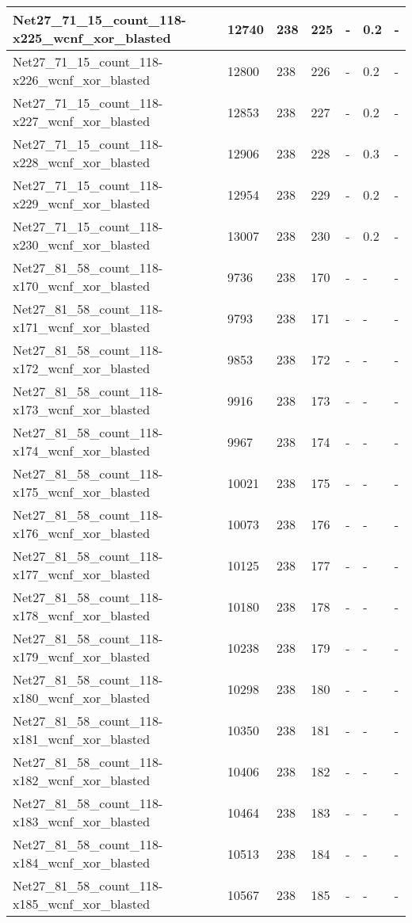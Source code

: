 \begin{scriptsize}
\begin{longtable}{|p{5cm}|l|l|l|l|l|l|}
Net27\_71\_15\_count\_118-x225\_wcnf\_xor\_blasted&12740&238&225&-&0.2&- \\ \hline 
Net27\_71\_15\_count\_118-x226\_wcnf\_xor\_blasted&12800&238&226&-&0.2&- \\ \hline 
Net27\_71\_15\_count\_118-x227\_wcnf\_xor\_blasted&12853&238&227&-&0.2&- \\ \hline 
Net27\_71\_15\_count\_118-x228\_wcnf\_xor\_blasted&12906&238&228&-&0.3&- \\ \hline 
Net27\_71\_15\_count\_118-x229\_wcnf\_xor\_blasted&12954&238&229&-&0.2&- \\ \hline 
Net27\_71\_15\_count\_118-x230\_wcnf\_xor\_blasted&13007&238&230&-&0.2&- \\ \hline 
Net27\_81\_58\_count\_118-x170\_wcnf\_xor\_blasted&9736&238&170&-&-&- \\ \hline 
Net27\_81\_58\_count\_118-x171\_wcnf\_xor\_blasted&9793&238&171&-&-&- \\ \hline 
Net27\_81\_58\_count\_118-x172\_wcnf\_xor\_blasted&9853&238&172&-&-&- \\ \hline 
Net27\_81\_58\_count\_118-x173\_wcnf\_xor\_blasted&9916&238&173&-&-&- \\ \hline 
Net27\_81\_58\_count\_118-x174\_wcnf\_xor\_blasted&9967&238&174&-&-&- \\ \hline 
Net27\_81\_58\_count\_118-x175\_wcnf\_xor\_blasted&10021&238&175&-&-&- \\ \hline 
Net27\_81\_58\_count\_118-x176\_wcnf\_xor\_blasted&10073&238&176&-&-&- \\ \hline 
Net27\_81\_58\_count\_118-x177\_wcnf\_xor\_blasted&10125&238&177&-&-&- \\ \hline 
Net27\_81\_58\_count\_118-x178\_wcnf\_xor\_blasted&10180&238&178&-&-&- \\ \hline 
Net27\_81\_58\_count\_118-x179\_wcnf\_xor\_blasted&10238&238&179&-&-&- \\ \hline 
Net27\_81\_58\_count\_118-x180\_wcnf\_xor\_blasted&10298&238&180&-&-&- \\ \hline 
Net27\_81\_58\_count\_118-x181\_wcnf\_xor\_blasted&10350&238&181&-&-&- \\ \hline 
Net27\_81\_58\_count\_118-x182\_wcnf\_xor\_blasted&10406&238&182&-&-&- \\ \hline 
Net27\_81\_58\_count\_118-x183\_wcnf\_xor\_blasted&10464&238&183&-&-&- \\ \hline 
Net27\_81\_58\_count\_118-x184\_wcnf\_xor\_blasted&10513&238&184&-&-&- \\ \hline 
Net27\_81\_58\_count\_118-x185\_wcnf\_xor\_blasted&10567&238&185&-&-&- \\ \hline 

\end{longtable}
\end{scriptsize}
